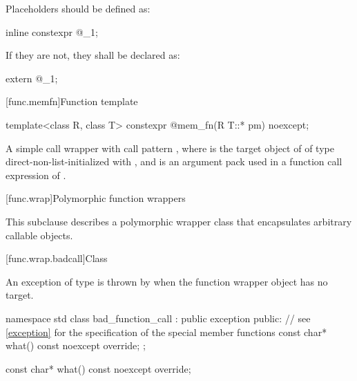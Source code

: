 \pnum
Placeholders should be defined as:
\begin{codeblock}
inline constexpr @\unspec@ _1{};
\end{codeblock}
If they are not, they shall be declared as:
\begin{codeblock}
extern @\unspec@ _1;
\end{codeblock}%

[func.memfn]{Function template }%

%
\begin{itemdecl}
template<class R, class T> constexpr @\unspec@ mem_fn(R T::* pm) noexcept;
\end{itemdecl}

\begin{itemdescr}
\pnum
\returns
A simple call wrapper 
with call pattern , where
 is the target object of  of type 
direct-non-list-initialized with , and
 is an argument pack
used in a function call expression of .
\end{itemdescr}

[func.wrap]{Polymorphic function wrappers}%

\pnum
This subclause describes a polymorphic wrapper class that
encapsulates arbitrary callable objects.

[func.wrap.badcall]{Class }%
%

\pnum
An exception of type  is thrown by
when the function wrapper object has no target.

\begin{codeblock}
namespace std {
  class bad_function_call : public exception {
  public:
    // see \ref{exception} for the specification of the special member functions
    const char* what() const noexcept override;
  };
}
\end{codeblock}

%
\begin{itemdecl}
const char* what() const noexcept override;
\end{itemdecl}

